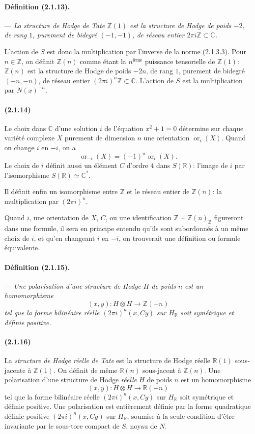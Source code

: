 \documentclass[10pt]{article}
\newcommand{\C}{\mathbb C}
\newcommand{\Z}{\mathbb Z}
\newcommand{\R}{\mathbb R}
\newcommand{\ornt}{\operatorname{or}}
\begin{document}
\paragraph{Définition (2.1.13).} --- \emph{La structure de Hodge de Tate $\Z(1)$ est la structure de Hodge de poids $-2$, de rang $1$, purement de bidegré $(-1,-1)$, de réseau entier $2\pi i\Z\subset\C$.}

L'action de $S$ est donc la multiplication par l'inverse de la norme (2.1.3.3). Pour $n\in\Z$, on définit $\Z(n)$ comme étant la $n^{\text{ième}}$ puissance tensorielle de $\Z(1)$: $\Z(n)$ est la structure de Hodge de poids $-2n$, de rang $1$, purement de bidegré $(-n,-n)$, de réseau entier $(2\pi i)^n\Z\subset\C$. L'action de $S$ est la multiplication par $N(x)^{-n}$.

\paragraph{(2.1.14)} Le choix dans $\C$ d'une solution $i$ de l'équation $x^2+1=0$ détermine sur chaque variété complexe $X$ purement de dimension $n$ une orientation $\ornt_i(X)$. Quand on change $i$ en $-i$, on a
\[
\ornt_{-i}(X)=(-1)^n\ornt_i(X).
\]
Le choix de $i$ définit aussi un élément $C$ d'ordre $4$ dans $S(\R)$: l'image de $i$ par l'isomorphisme $S(\R)\simeq\C^*$.

Il définit enfin un isomorphisme entre $\Z$ et le réseau entier de $\Z(n)$: la multiplication par $(2\pi i)^n$.

Quand $i$, une orientation de $X$, $C$, ou une identification $\Z\sim\Z(n)_\Z$ figureront dans une formule, il sera en principe entendu qu'ils sont subordonnés à un même choix de $i$, et qu'en changeant $i$ en $-i$, on trouverait une définition ou formule équivalente.

\paragraph{Définition (2.1.15).} --- {\itshape Une polarisation d'une structure de Hodge $H$ de poids $n$ est un homomorphisme
\[
(x,y):H\otimes H\longrightarrow\Z(-n)
\]
tel que la forme bilinéaire réelle $(2\pi i)^n(x,Cy)$ sur $H_\R$ soit symétrique et définie positive.}

\paragraph{(2.1.16)} La \emph{structure de Hodge réelle de Tate} est la structure de Hodge réelle $\R(1)$ sous-jacente à $\Z(1)$. On définit de même $\R(n)$ sous-jacent à $\Z(n)$. Une polarisation d'une structure de Hodge \emph{réelle} $H$ de poids $n$ est un homomorphisme
\[
(x,y):H\otimes H\longrightarrow\R(-n)
\]
tel que la forme bilinéaire réelle $(2\pi i)^n(x,Cy)$ sur $H_\R$ soit symétrique et définie positive. Une polarisation est entièrement définie par la forme quadratique définie positive $(2\pi i)^n(x,Cy)$ sur $H_\R$, soumise à la seule condition d'être invariante par le sous-tore compact de $S$, noyau de $N$.
\end{document}
